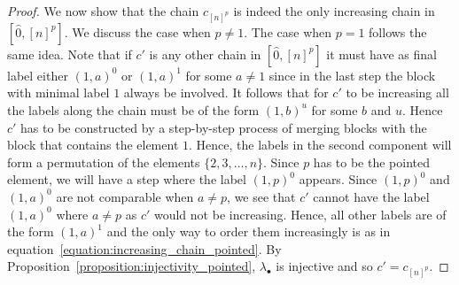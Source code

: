 \documentclass[11pt]{article}
\theoremstyle{definition}
\numberwithin{equation}{section}
\begin{document}
\begin{proof}
We now show that the chain $c_{[n]^p}$ is indeed the only increasing chain in $[\hat{0},[n]^p]$. We discuss the case when $p\neq 1$. The case when $p=1$ follows the same idea. Note that if $c'$ is any other chain in $[\hat{0},[n]^p]$ it must have as final label either $(1,a)^0$ or $(1,a)^1$ for some $a\neq 1$ since in the last step the block with minimal label $1$ always be involved.  It follows that for $c'$ to be increasing all the labels along the chain must be of the form $(1,b)^u$ for some $b$ and $u$.  Hence $c'$ has to be constructed by a step-by-step process of merging blocks with the block that contains the element $1$. Hence, the labels in the second component will form a permutation  of the elements $\{2,3,\dots, n\}$. Since $p$ has to be the pointed element, we will have a step where the label $(1,p)^0$ appears. Since  $(1,p)^0$ and $(1,a)^0$ are not comparable when $a\neq p$, we see that $c'$ cannot have the label $(1,a)^0$ where $a\neq p$ as $c'$ would not be increasing.  Hence, all other labels are of the form  $(1,a)^1$ and the only way to order them increasingly is as in equation~\eqref{equation:increasing_chain_pointed}. By Proposition~\ref{proposition:injectivity_pointed}, $\lambda_{\bullet}$ is injective and so $c'=c_{[n]^p}$.




\end{proof}
\end{document}
